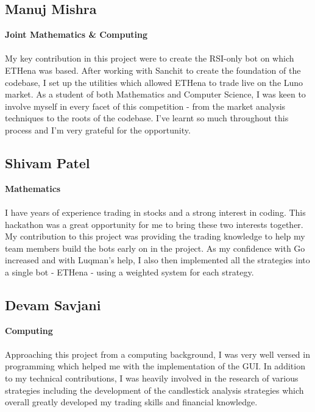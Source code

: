 \documentclass[12pt]{article}
\begin{document}
\begin{multicols}{2}
    \subsection{Manuj Mishra}
    \vspace{-0.375cm}\textbf{\footnotesize{Joint Mathematics \& Computing}} \\ \\
    My key contribution in this project were to create the RSI-only bot on which ETHena was based. After working with Sanchit to create the foundation of the codebase, I set up the utilities which allowed ETHena to trade live on the Luno market. As a student of both Mathematics and Computer Science, I was keen to involve myself in every facet of this competition - from the market analysis techniques to the roots of the codebase. I've learnt so much throughout this process and I'm very grateful for the opportunity.

    \subsection{Shivam Patel}
    \vspace{-0.375cm}\textbf{\footnotesize{Mathematics}} \\ \\
    I have years of experience trading in stocks and a strong interest in coding. This hackathon was a great opportunity for me to bring these two interests together. My contribution to this project was providing the trading knowledge to help my team members build the bots early on in the project. As my confidence with Go increased and with Luqman's help, I also then implemented all the strategies into a single bot - ETHena - using a weighted system for each strategy.
    \vspace{4cm}
    \subsection{Devam Savjani}
    \vspace{-0.375cm}\textbf{\footnotesize{Computing}} \\ \\
    Approaching this project from a computing background, I was very well versed in programming which helped me with the implementation of the GUI. In addition to my technical contributions, I was heavily involved in the research of various strategies including the development of the candlestick analysis strategies which overall greatly developed my trading skills and financial knowledge.

\end{multicols}
\end{document}

